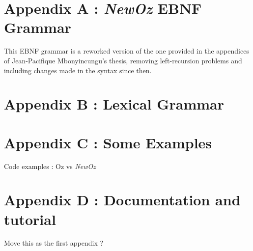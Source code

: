 
\section*{Appendix A : \textit{NewOz} EBNF Grammar}\label{sec:appendix-grammar}
This EBNF grammar is a reworked version of the one provided in the appendices of Jean-Pacifique Mbonyincungu's thesis,
removing left-recursion problems and including changes made in the syntax since then.


\section*{Appendix B : Lexical Grammar}\label{sec:appendix-lexical-grammar}


\section*{Appendix C : Some Examples}\label{sec:appendix-examples}
Code examples : Oz vs \textit{NewOz}

\section*{Appendix D : Documentation and tutorial}\label{sec:appendix-doc}
Move this as the first appendix ?
